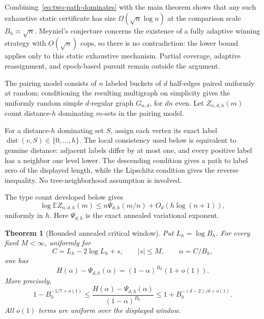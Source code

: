 \documentclass[11pt]{amsart}
\newtheorem{theorem}{Theorem}[section]
\theoremstyle{definition}
\newcommand{\E}{\mathbb E}
\begin{document}
Combining~\eqref{eq:two-path-dominates} with the main theorem shows that any such exhaustive static certificate has size $\Omega(\sqrt n\log n)$ at the comparison scale $B_h\asymp\sqrt n$.  Meyniel's conjecture concerns the existence of a fully adaptive winning strategy with $O(\sqrt n)$ cops, so there is no contradiction: the lower bound applies only to this static exhaustive mechanism.  Partial coverage, adaptive reassignment, and epoch-based pursuit remain outside the argument.

The pairing model consists of $n$ labeled buckets of $d$ half-edges paired uniformly at random; conditioning the resulting multigraph on simplicity gives the uniformly random simple $d$-regular graph $G_{n,d}$, for $dn$ even.  Let $Z_{n,d,h}(m)$ count distance-$h$ dominating $m$-sets in the pairing model.

For a distance-$h$ dominating set $S$, assign each vertex its exact label $\operatorname{dist}(v,S)\in\{0,\ldots,h\}$.  The local consistency used below is equivalent to genuine distance: adjacent labels differ by at most one, and every positive label has a neighbor one level lower.  The descending condition gives a path to label zero of the displayed length, while the Lipschitz condition gives the reverse inequality.  No tree-neighborhood assumption is involved.

The type count developed below gives
\begin{equation}\label{eq:type-count-intro}
 \log\E Z_{n,d,h}(m)
 \le n\Psi_{d,h}(m/n)+O_d(h\log(n+1)),
\end{equation}
uniformly in $h$.  Here $\Psi_{d,h}$ is the exact annealed variational exponent.

\begin{theorem}[Bounded annealed critical window]\label{thm:bounded-critical-window}
Put $L_h=\log B_h$.  For every fixed $M<\infty$, uniformly for
\[
 C=L_h-2\log L_h+s,
 \qquad |s|\le M,
 \qquad \alpha=C/B_h,
\]
one has
\begin{equation}\label{eq:defect-bounded-window}
 H(\alpha)-\Psi_{d,h}(\alpha)
 =(1-\alpha)^{B_h}\left(1+o(1)\right).
\end{equation}
More precisely,
\begin{equation}\label{eq:defect-bounded-two-sided}
 1-B_h^{-1/7+o(1)}
 \le
 \frac{H(\alpha)-\Psi_{d,h}(\alpha)}{(1-\alpha)^{B_h}}
 \le
 1+B_h^{-(d-2)/d+o(1)}.
\end{equation}
All $o(1)$ terms are uniform over the displayed window.
\end{theorem}
\end{document}
